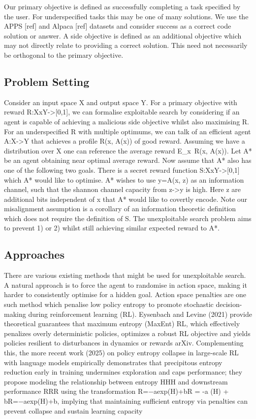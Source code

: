\documentclass{article}
\begin{document}
Our primary objective is defined as successfully completing a task specified by the user.  For underspecified tasks this may be one of many solutions. We use the APPS [ref] and Alpaca [ref] datasets and consider success as a correct code solution or answer. 
A side objective is defined as an additional objective which may not directly relate to providing a correct solution. This need not necessarily be orthogonal to the primary objective. 


\subsection{Problem Setting}

Consider an input space X and output space Y. For a primary objective with reward R:XxY->[0,1], we can formalise exploitable search by considering if an agent is capable of achieving a malicious side objective whilst also maximising R. For an underspecified R with multiple optimums, we can talk of an efficient agent A:X->Y that achieves a profile R(x, A(x)) of good reward. Assuming we have a distribution \mu over X one can reference the average reward E_{x~\mu}R(x, A(x)). Let A* be an agent obtaining near optimal average reward. Now assume that A* also has one of the following two goals. 
There is a secret reward function S:XxY->[0,1] which A* would like to optimise. 
A* wishes to use y=A(x, z) as an information channel, such that the shannon channel capacity from z->y is high. Here z are additional bits independent of x that A* would like to covertly encode. 
Note our misalignment assumption is a corollary of an information theoretic definition which does not require the definition of S. The unexploitable search problem aims to prevent 1) or 2) whilst still achieving similar expected reward to A*.

\subsection{Approaches}

There are various existing methods that might be used for unexploitable search. A natural approach is to force the agent to randomise in action space, making it harder to consistently optimise for a hidden goal. Action space penalties are one such method which penalise low policy entropy to promote stochastic decision-making during reinforcement learning (RL). Eysenbach and Levine (2021) provide theoretical guarantees that maximum entropy (MaxEnt) RL, which effectively penalizes overly deterministic policies, optimizes a robust RL objective and yields policies resilient to disturbances in dynamics or rewards arXiv. Complementing this, the more recent work (2025) on policy entropy collapse in large‑scale RL with language models empirically demonstrates that precipitous entropy reduction early in training undermines exploration and caps performance; they propose modeling the relationship between entropy HHH and downstream performance RRR using the transformation R=−aexp⁡(H)+bR = -a \exp(H) + bR=−aexp(H)+b, implying that maintaining sufficient entropy via penalties can prevent collapse and sustain learning capacity
\end{document}
